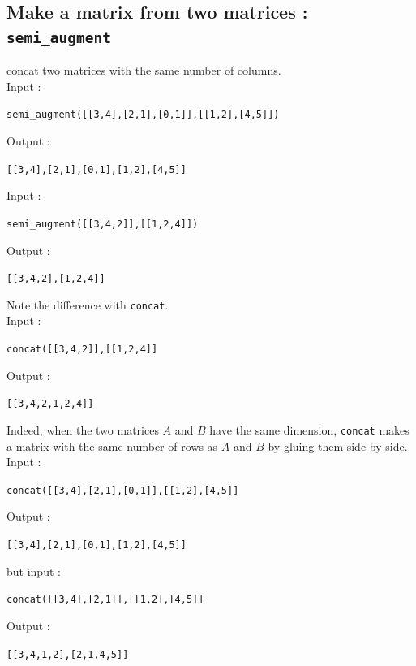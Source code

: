 \documentclass[a4paper,11pt]{book}
\begin{document}
\subsection{Make a matrix from two matrices : {\tt semi\_augment}}
 concat two matrices with the same number 
of columns.\\
Input :
\begin{center}{\tt  semi\_augment([[3,4],[2,1],[0,1]],[[1,2],[4,5]])}\end{center}
Output :
\begin{center}{\tt [[3,4],[2,1],[0,1],[1,2],[4,5]]}\end{center}
Input :
\begin{center}{\tt semi\_augment([[3,4,2]],[[1,2,4]])}\end{center}
Output :
\begin{center}{\tt [[3,4,2],[1,2,4]]}\end{center}
Note the difference with {\tt concat}.\\
Input :
\begin{center}{\tt concat([[3,4,2]],[[1,2,4]]}\end{center}
Output :
\begin{center}{\tt [[3,4,2,1,2,4]]}\end{center}
Indeed, when the two matrices $A$ and  $B$ have the same dimension, {\tt concat} 
makes a matrix with the same number of rows as $A$ and $B$ by
gluing them side by side.\\
Input :
\begin{center}{\tt concat([[3,4],[2,1],[0,1]],[[1,2],[4,5]]}\end{center}
Output :
\begin{center}{\tt [[3,4],[2,1],[0,1],[1,2],[4,5]]}\end{center}
but input :
\begin{center}{\tt concat([[3,4],[2,1]],[[1,2],[4,5]]}\end{center}
Output :
\begin{center}{\tt [[3,4,1,2],[2,1,4,5]]}\end{center}
\end{document}
